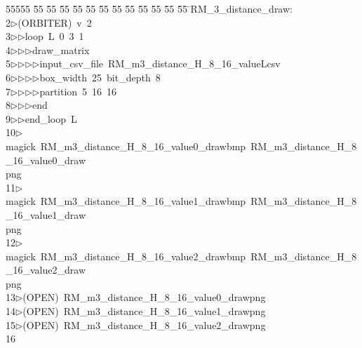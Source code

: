 %
%
\begin{tabbing}
55555 \= 55 \= 55 \= 55 \= 55 \= 55 \= 55 \= 55 \= 55 \= 55 \= 55 \= 55 \= 55 \= \>RM\_3\_distance\_draw:\\[0pt]
2\>$\triangleright$\>(ORBITER)\ v\ 2\ \\[0pt]
3\>$\triangleright$\>$\triangleright$\>loop\ L\ 0\ 3\ 1\ \\[0pt]
4\>$\triangleright$\>$\triangleright$\>$\triangleright$\>draw\_matrix\ \\[0pt]
5\>$\triangleright$\>$\triangleright$\>$\triangleright$\>$\triangleright$\>input\_csv\_file\ RM\_m3\_distance\_H\_8\_16\_valueLcsv\ \\[0pt]
6\>$\triangleright$\>$\triangleright$\>$\triangleright$\>$\triangleright$\>box\_width\ 25\ bit\_depth\ 8\ \\[0pt]
7\>$\triangleright$\>$\triangleright$\>$\triangleright$\>$\triangleright$\>partition\ 5\ 16\ 16\ \\[0pt]
8\>$\triangleright$\>$\triangleright$\>$\triangleright$\>end\ \\[0pt]
9\>$\triangleright$\>$\triangleright$\>end\_loop\ L\\[0pt]
10\>$\triangleright$\>magick\ RM\_m3\_distance\_H\_8\_16\_value0\_drawbmp\ RM\_m3\_distance\_H\_8\_16\_value0\_draw\\[0pt]
\>png\\[0pt]
11\>$\triangleright$\>magick\ RM\_m3\_distance\_H\_8\_16\_value1\_drawbmp\ RM\_m3\_distance\_H\_8\_16\_value1\_draw\\[0pt]
\>png\\[0pt]
12\>$\triangleright$\>magick\ RM\_m3\_distance\_H\_8\_16\_value2\_drawbmp\ RM\_m3\_distance\_H\_8\_16\_value2\_draw\\[0pt]
\>png\\[0pt]
13\>$\triangleright$\>(OPEN)\ RM\_m3\_distance\_H\_8\_16\_value0\_drawpng\\[0pt]
14\>$\triangleright$\>(OPEN)\ RM\_m3\_distance\_H\_8\_16\_value1\_drawpng\\[0pt]
15\>$\triangleright$\>(OPEN)\ RM\_m3\_distance\_H\_8\_16\_value2\_drawpng\\[0pt]
16\>\end{tabbing}
